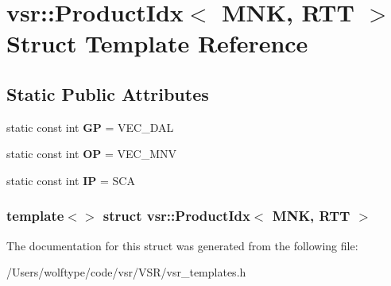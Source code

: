 \hypertarget{structvsr_1_1_product_idx_3_01_m_n_k_00_01_r_t_t_01_4}{\section{vsr\-:\-:Product\-Idx$<$ M\-N\-K, R\-T\-T $>$ Struct Template Reference}
\label{structvsr_1_1_product_idx_3_01_m_n_k_00_01_r_t_t_01_4}
}
\subsection*{Static Public Attributes}
\begin{DoxyCompactItemize}
\item 
\hypertarget{structvsr_1_1_product_idx_3_01_m_n_k_00_01_r_t_t_01_4_a1666fb4eb105d1e320f8cbec65e0b892}{static const int {\bfseries G\-P} = V\-E\-C\-\_\-\-D\-A\-L}\label{structvsr_1_1_product_idx_3_01_m_n_k_00_01_r_t_t_01_4_a1666fb4eb105d1e320f8cbec65e0b892}

\item 
\hypertarget{structvsr_1_1_product_idx_3_01_m_n_k_00_01_r_t_t_01_4_a1eb6a8e76c023d4109fcc7266cd43e8f}{static const int {\bfseries O\-P} = V\-E\-C\-\_\-\-M\-N\-V}\label{structvsr_1_1_product_idx_3_01_m_n_k_00_01_r_t_t_01_4_a1eb6a8e76c023d4109fcc7266cd43e8f}

\item 
\hypertarget{structvsr_1_1_product_idx_3_01_m_n_k_00_01_r_t_t_01_4_a8ac9fbbf86d1eb39227e25939e8f3783}{static const int {\bfseries I\-P} = S\-C\-A}\label{structvsr_1_1_product_idx_3_01_m_n_k_00_01_r_t_t_01_4_a8ac9fbbf86d1eb39227e25939e8f3783}

\end{DoxyCompactItemize}
\subsubsection*{template$<$$>$ struct vsr\-::\-Product\-Idx$<$ M\-N\-K, R\-T\-T $>$}



The documentation for this struct was generated from the following file\-:\begin{DoxyCompactItemize}
\item 
/\-Users/wolftype/code/vsr/\-V\-S\-R/vsr\-\_\-templates.\-h\end{DoxyCompactItemize}
